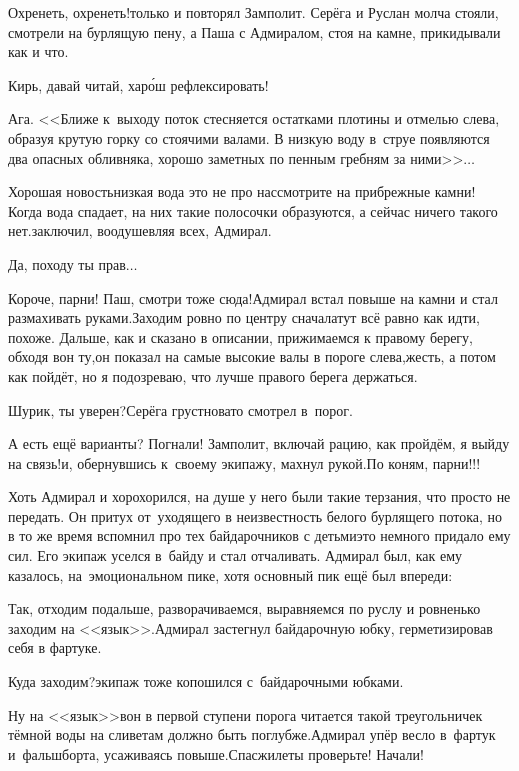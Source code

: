 \diagdash Охренеть, охренеть!\mdash только и повторял Замполит. Серёга и Руслан молча стояли, смотрели на бурлящую пену, а Паша с Адмиралом, стоя на камне, прикидывали как и что.

\diagdash Кирь, давай читай, хар{\'о}ш рефлексировать!

\diagdash Ага. <<Ближе к~выходу поток стесняется остатками плотины и отмелью слева, образуя крутую горку со стоячими валами. В низкую воду в~струе появляются два опасных обливняка, хорошо заметных по пенным гребням за ними>>$\ldots$

\diagdash Хорошая новость\mdash низкая вода это не про нас\mdash смотрите на прибрежные камни! Когда вода спадает, на них такие полосочки образуются, а сейчас ничего такого нет.\mdash заключил, воодушевляя всех, Адмирал.

\diagdash Да, походу ты прав$\ldots$

\diagdash Короче, парни! Паш, смотри тоже сюда!\mdash Адмирал встал повыше на камни и стал размахивать руками.\mdash Заходим ровно по центру сначала\mdash тут всё равно как идти, похоже. Дальше, как и сказано в описании, прижимаемся к правому берегу, обходя вон ту,\mdash он показал на самые высокие валы в пороге слева,\mdash жесть, а потом как пойдёт, но я подозреваю, что лучше правого берега держаться.

\diagdash Шурик, ты уверен?\mdash Серёга грустновато смотрел в~порог.

\diagdash А есть ещё варианты? Погнали! Замполит, включай рацию, как пройдём, я выйду на связь!\mdash и, обернувшись к~своему экипажу, махнул рукой.\mdash По коням, парни!!!

Хоть Адмирал и хорохорился, на душе у него были такие терзания, что просто не передать. Он притух от~уходящего в неизвестность белого бурлящего потока, но в то же время вспомнил про тех байдарочников с детьми\mdash это немного придало ему сил. Его экипаж уселся в~байду и стал отчаливать. Адмирал был, как ему казалось, на~эмоциональном пике, хотя основный пик ещё был впереди:

\diagdash Так, отходим подальше, разворачиваемся, выравняемся по руслу и ровненько заходим на <<язык>>.\mdash Адмирал застегнул байдарочную юбку, герметизировав себя в фартуке.

\diagdash Куда заходим?\mdash экипаж тоже копошился с~байдарочными юбками.

\diagdash Ну на <<язык>>\mdash вон в первой ступени порога читается такой треугольничек тёмной воды на сливе\mdash там должно быть поглубже.\mdash Адмирал упёр весло в~фартук и~фальшборта, усаживаясь повыше.\mdash Спасжилеты проверьте! Начали!

